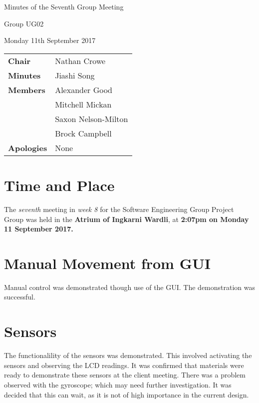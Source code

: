 \documentclass{article}
\begin{document}
\begin{center}    
{\huge Minutes of the Seventh Group Meeting \par}
\vspace{0.5cm}
{\large Group UG02 \par}
\vspace{0.5cm}
{\large Monday 11th September 2017 \par}
\vspace{0.5cm}
\end{center}

\begin{flushleft}
\begin{tabular}{ll}
{\bfseries Chair} &  Nathan Crowe \\
{\bfseries Minutes} & Jiashi Song \\
{\bfseries Members}
 & Alexander Good \\
 & Mitchell Mickan \\
 & Saxon Nelson-Milton \\
 & Brock Campbell \\
{\bfseries Apologies} & None\\
\end{tabular}
\end{flushleft}

\section{Time and Place}
The {\itshape seventh} meeting in {\itshape week 8} for the Software Engineering Group Project Group was held in the {\bfseries Atrium of Ingkarni Wardli}, at {\bfseries 2:07pm on Monday 11 September 2017.} 

\section{Manual Movement from GUI}
Manual control was demonstrated though use of the GUI. The demonstration was successful. 

\section{Sensors}
The functionalility of the sensors was demonstrated. This involved activating the sensors and observing the LCD readings. It was confirmed that materials were ready to demonstrate these sensors at the client meeting. There was a problem observed with the gyroscope; which may need further investigation. It was decided that this can wait, as it is not of high importance in the current design.
\end{document}
